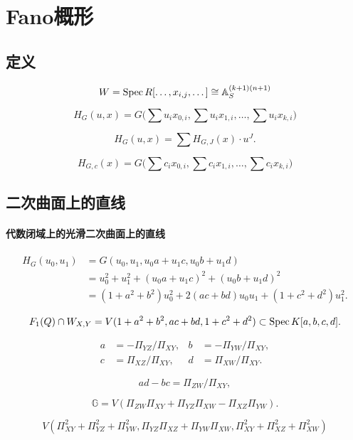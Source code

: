 \section{Fano概形}\label{s:4.3}
\subsection{定义}\label{s:4.3.1}


\[
	W=\operatorname{Spec} R[\dots,x_{i,j},\dots]\cong \mathbb{A}_S^{(k+1)(n+1)}
\]

\[
	H_G(u,x)=G\bigl(\sum u_ix_{0,i},\sum u_ix_{1,i},\dots,\sum u_ix_{k,i}\bigr)
\]

\[
	H_G(u,x)=\sum H_{G,J}(x)\cdot u^J.
\]

\[
	H_{G,c}(x)=G\bigl(\sum c_ix_{0,i},\sum c_ix_{1,i},\dots,\sum c_ix_{k,i}\bigr)
\]


\subsection{二次曲面上的直线}\label{s:4.3.2}

\paragraph*{代数闭域上的光滑二次曲面上的直线}

\[
	\begin{aligned}
		H_G(u_0,u_1)&=G(u_0,u_1,u_0a+u_1c,u_0b+u_1d)\\
		&=u_0^2+u_1^2+(u_0a+u_1c)^2+(u_0b+u_1d)^2\\
		&=(1+a^2+b^2)u_0^2+2(ac+bd)u_0u_1+(1+c^2+d^2)u_1^2.
	\end{aligned}
\]

\[
	F_1(Q)\cap W_{X,Y}=V(1+a^2+b^2,ac+bd,1+c^2+d^2)\subset \operatorname{Spec} K[a,b,c,d].
\]


\[
	\begin{aligned}
		a&=-\Pi_{YZ}/\Pi_{XY},&b&=-\Pi_{YW}/\Pi_{XY},\\
		c&=\Pi_{XZ}/\Pi_{XY},&d&=\Pi_{XW}/\Pi_{XY}.
	\end{aligned}
\]

\[
	ad-bc=\Pi_{ZW}/\Pi_{XY},
\]

\[
	\mathbb G=V(\Pi_{ZW}\Pi_{XY}+\Pi_{YZ}\Pi_{XW}-\Pi_{XZ}\Pi_{YW}).
\]

\[
	V(\Pi_{XY}^2+\Pi_{YZ}^2+\Pi_{YW}^2,\Pi_{YZ}\Pi_{XZ}+\Pi_{YW}\Pi_{XW},\Pi_{XY}^2+\Pi_{XZ}^2+\Pi_{XW}^2)
\]